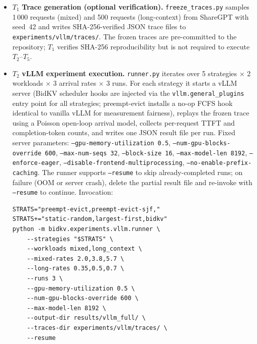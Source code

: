 \documentclass[conference]{IEEEtran}
\begin{document}
\begin{itemize}
  \item $T_1$ \textbf{Trace generation (optional verification).}
    \texttt{freeze\_traces.py} samples 1\,000 requests (mixed) and 500
    requests (long-context) from ShareGPT with seed~42 and writes
    SHA-256-verified JSON trace files to \texttt{experiments/vllm/traces/}.
    The frozen traces are pre-committed to the repository;
    $T_1$ verifies SHA-256 reproducibility but is not required
    to execute $T_2$--$T_5$.

  \item $T_2$ \textbf{vLLM experiment execution.}
    \texttt{runner.py} iterates over 5 strategies $\times$ 2 workloads
    $\times$ 3 arrival rates $\times$ 3 runs.
    For each strategy it starts a vLLM server (BidKV scheduler hooks are
    injected via the \texttt{vllm.general\_plugins} entry point for all
    strategies; preempt-evict installs a no-op FCFS hook identical to
    vanilla vLLM for measurement fairness), replays the frozen trace using a
    Poisson open-loop arrival model, collects per-request TTFT and
    completion-token counts, and writes one JSON result file per run.
    Fixed server parameters: \texttt{--gpu-memory-utilization~0.5},
    \texttt{--num-gpu-blocks-override~600}, \texttt{--max-num-seqs~32},
    \texttt{--block-size~16}, \texttt{--max-model-len~8192},
    \texttt{--enforce-eager}, \texttt{--disable-frontend-multiprocessing},
    \texttt{--no-enable-prefix-caching}.
    The runner supports \texttt{--resume} to skip already-completed
    runs; on failure (OOM or server crash), delete the partial result
    file and re-invoke with \texttt{--resume} to continue.
    Invocation:
    \begin{Verbatim}
STRATS="preempt-evict,preempt-evict-sjf,"
STRATS+="static-random,largest-first,bidkv"
python -m bidkv.experiments.vllm.runner \
    --strategies "$STRATS" \
    --workloads mixed,long_context \
    --mixed-rates 2.0,3.8,5.7 \
    --long-rates 0.35,0.5,0.7 \
    --runs 3 \
    --gpu-memory-utilization 0.5 \
    --num-gpu-blocks-override 600 \
    --max-model-len 8192 \
    --output-dir results/vllm_full/ \
    --traces-dir experiments/vllm/traces/ \
    --resume
    \end{Verbatim}


\end{itemize}
\end{document}
